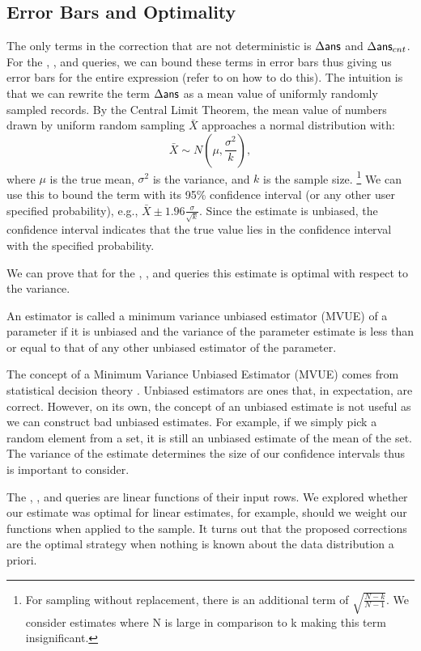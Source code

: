 \subsection{Error Bars and Optimality}\label{subsec:correct-practical}
The only terms in the correction that are not deterministic is $\Delta\textsf{ans}$ and $\Delta\textsf{ans}_{cnt}$.
For the \sumfunc, \countfunc, and \avgfunc queries, we can bound these terms in error bars thus giving us error bars for the entire expression (refer to \cite{wang1999sample} on how to do this).
The intuition is that we can rewrite the term $\Delta\textsf{ans}$ as a mean value of uniformly randomly sampled records.
By the Central Limit Theorem, the mean value of numbers drawn by uniform random sampling $\bar{X}$ approaches a normal distribution with:
\[
\bar{X} \sim N(\mu,\frac{\sigma^2}{k}),
\]
where $\mu$ is the true mean, $\sigma^2$ is the variance, and $k$ is the sample size. \footnote{For sampling without replacement, there is an additional term of $\sqrt{\frac{N-k}{N-1}}$. We consider estimates where N is large in comparison to k making this term insignificant.}
We can use this to bound the term with its 95\% confidence interval (or any other user specified probability), e.g., $\bar{X} \pm 1.96 \frac{\sigma}{\sqrt{k}}$.
Since the estimate is unbiased, the confidence interval indicates that the true value lies in the confidence interval with the specified probability.

We can prove that for the \sumfunc, \countfunc, and \avgfunc queries this estimate is optimal with respect to the variance.
\begin{proposition}
An estimator is called a minimum variance unbiased estimator (MVUE) of a parameter if it is unbiased and the variance of the parameter estimate is less than or equal to that of any other unbiased estimator of the parameter.
\end{proposition}
The concept of a Minimum Variance Unbiased Estimator (MVUE) comes from statistical decision theory \cite{cox1979theoretical}.
Unbiased estimators are ones that, in expectation, are correct.
However, on its own, the concept of an unbiased estimate is not useful as we can construct bad unbiased estimates.
For example, if we simply pick a random element from a set, it is still an unbiased estimate of the mean of the set.
The variance of the estimate determines the size of our confidence intervals thus is important to consider.

The \sumfunc, \countfunc, and \avgfunc queries are linear functions of their input rows.
We explored whether our estimate was optimal for linear estimates, for example, should we weight our functions when applied to the sample.
It turns out that the proposed corrections are the optimal strategy when nothing is known about the data distribution a priori.

